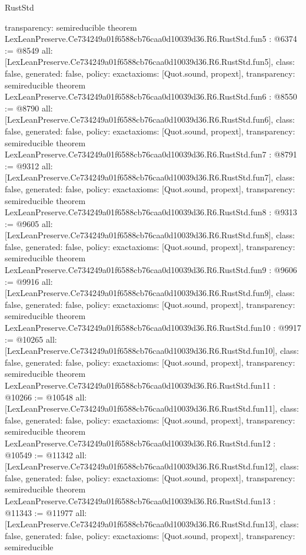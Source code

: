 \begin{lexlean}{RustStd}
\begin{coremodule}
{  transparency: semireducible
}
theorem LexLeanPreserve.Ce734249a01f6588cb76caa0d10039d36.R6.RustStd.fun5 : @6374 := @8549 {
  all: [LexLeanPreserve.Ce734249a01f6588cb76caa0d10039d36.R6.RustStd.fun5],
  class: false,
  generated: false,
  policy: exact{axioms: [Quot.sound, propext]},
  transparency: semireducible
}
theorem LexLeanPreserve.Ce734249a01f6588cb76caa0d10039d36.R6.RustStd.fun6 : @8550 := @8790 {
  all: [LexLeanPreserve.Ce734249a01f6588cb76caa0d10039d36.R6.RustStd.fun6],
  class: false,
  generated: false,
  policy: exact{axioms: [Quot.sound, propext]},
  transparency: semireducible
}
theorem LexLeanPreserve.Ce734249a01f6588cb76caa0d10039d36.R6.RustStd.fun7 : @8791 := @9312 {
  all: [LexLeanPreserve.Ce734249a01f6588cb76caa0d10039d36.R6.RustStd.fun7],
  class: false,
  generated: false,
  policy: exact{axioms: [Quot.sound, propext]},
  transparency: semireducible
}
theorem LexLeanPreserve.Ce734249a01f6588cb76caa0d10039d36.R6.RustStd.fun8 : @9313 := @9605 {
  all: [LexLeanPreserve.Ce734249a01f6588cb76caa0d10039d36.R6.RustStd.fun8],
  class: false,
  generated: false,
  policy: exact{axioms: [Quot.sound, propext]},
  transparency: semireducible
}
theorem LexLeanPreserve.Ce734249a01f6588cb76caa0d10039d36.R6.RustStd.fun9 : @9606 := @9916 {
  all: [LexLeanPreserve.Ce734249a01f6588cb76caa0d10039d36.R6.RustStd.fun9],
  class: false,
  generated: false,
  policy: exact{axioms: [Quot.sound, propext]},
  transparency: semireducible
}
theorem LexLeanPreserve.Ce734249a01f6588cb76caa0d10039d36.R6.RustStd.fun10 : @9917 := @10265 {
  all: [LexLeanPreserve.Ce734249a01f6588cb76caa0d10039d36.R6.RustStd.fun10],
  class: false,
  generated: false,
  policy: exact{axioms: [Quot.sound, propext]},
  transparency: semireducible
}
theorem LexLeanPreserve.Ce734249a01f6588cb76caa0d10039d36.R6.RustStd.fun11 : @10266 := @10548 {
  all: [LexLeanPreserve.Ce734249a01f6588cb76caa0d10039d36.R6.RustStd.fun11],
  class: false,
  generated: false,
  policy: exact{axioms: [Quot.sound, propext]},
  transparency: semireducible
}
theorem LexLeanPreserve.Ce734249a01f6588cb76caa0d10039d36.R6.RustStd.fun12 : @10549 := @11342 {
  all: [LexLeanPreserve.Ce734249a01f6588cb76caa0d10039d36.R6.RustStd.fun12],
  class: false,
  generated: false,
  policy: exact{axioms: [Quot.sound, propext]},
  transparency: semireducible
}
theorem LexLeanPreserve.Ce734249a01f6588cb76caa0d10039d36.R6.RustStd.fun13 : @11343 := @11977 {
  all: [LexLeanPreserve.Ce734249a01f6588cb76caa0d10039d36.R6.RustStd.fun13],
  class: false,
  generated: false,
  policy: exact{axioms: [Quot.sound, propext]},
  transparency: semireducible
}
\end{coremodule}
\end{lexlean}
